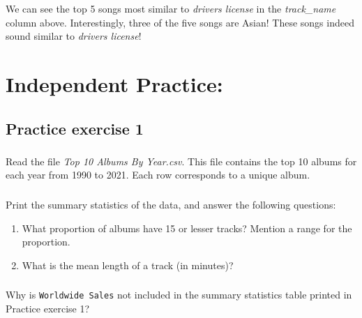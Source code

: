 \documentclass[
  letterpaper,
  DIV=11,
  numbers=noendperiod]{scrreprt}
\providecommand{\tightlist}{%
  \setlength{\itemsep}{0pt}\setlength{\parskip}{0pt}}\usepackage{longtable,booktabs,array}
\begin{document}
We can see the top 5 songs most similar to \emph{drivers license} in the
\emph{track\_name} column above. Interestingly, three of the five songs
are Asian! These songs indeed sound similar to \emph{drivers license}!

\hypertarget{independent-practice-1}{%
\section{Independent Practice:}\label{independent-practice-1}}

\hypertarget{practice-exercise-1-2}{%
\subsection{Practice exercise 1}\label{practice-exercise-1-2}}

\hypertarget{section-18}{%
\subsubsection{}\label{section-18}}

Read the file \emph{Top 10 Albums By Year.csv}. This file contains the
top 10 albums for each year from 1990 to 2021. Each row corresponds to a
unique album.

\hypertarget{section-19}{%
\subsubsection{}\label{section-19}}

Print the summary statistics of the data, and answer the following
questions:

\begin{enumerate}
\def\labelenumi{\arabic{enumi}.}
\tightlist
\item
  What proportion of albums have 15 or lesser tracks? Mention a range
  for the proportion.
\item
  What is the mean length of a track (in minutes)?
\end{enumerate}

\hypertarget{section-20}{%
\subsubsection{}\label{section-20}}

Why is \texttt{Worldwide\ Sales} not included in the summary statistics
table printed in Practice exercise 1?

\hypertarget{section-21}{%
\subsubsection{}\label{section-21}}
\end{document}
